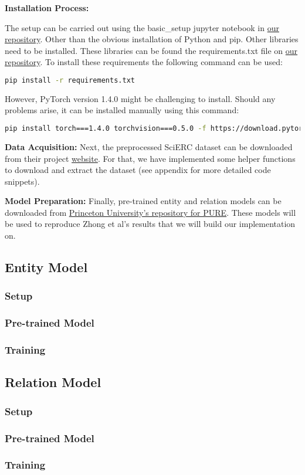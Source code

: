 \textbf{Installation Process:}

The setup can be carried out using the basic\_setup jupyter notebook in \href{https://github.com/OdaiMohammad/pure-ere-reproduction}{our repository}. Other than the obvious installation of Python and pip. Other libraries need to be installed. These libraries can be found the requirements.txt file on \href{https://github.com/OdaiMohammad/pure-ere-reproduction}{our repository}\cite{my-github-repo-code}. To install these requirements the following command can be used:

\begin{lstlisting}[language=bash, caption=Instalation of project requirements]
pip install -r requirements.txt
\end{lstlisting}

However, PyTorch version 1.4.0 might be challenging to install. Should any problems arise, it can be installed manually using this command:

\begin{lstlisting}[language=bash, caption=Instalation of project requirements]
pip install torch===1.4.0 torchvision===0.5.0 -f https://download.pytorch.org/whl/torch_stable.html
\end{lstlisting}

\textbf{Data Acquisition:}
Next, the preprocessed SciERC dataset can be downloaded from their project \href{https://nlp.cs.washington.edu/sciIE/}{website}\cite{scierc-project}. For that, we have implemented some helper functions to download and extract the dataset (see appendix for more detailed code snippets).

\textbf{Model Preparation:}
Finally, pre-trained entity and relation models can be downloaded from \href{https://nlp.cs.princeton.edu/projects/pure/scierc_models/}{Princeton University's repository for PURE}\cite{pure-project-princeton-repo}. These models will be used to reproduce Zhong et al's\cite{Zhong2020AFE} results that we will build our implementation on.

\subsection{Entity Model}
\subsubsection{Setup}
\subsubsection{Pre-trained Model}
\subsubsection{Training}

\subsection{Relation Model}
\subsubsection{Setup}
\subsubsection{Pre-trained Model}
\subsubsection{Training}
